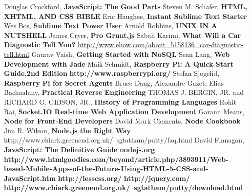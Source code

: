 \documentclass[11pt, oneside]{Thesis} %
\begin{document}
\begin{thebibliography}{999}
Douglas Crockford, \textbf{JavaScript: The Good Parts}
Steven M. Schafer, \textbf{HTML, XHTML, AND CSS BIBLE}
Eric Haughee, \textbf{Instant Sublime Text Starter}
Wes Bos, \textbf{Sublime Text Power User}
Arnold Robbins, \textbf{UNIX IN A NUTSHELL}
James Cryer, \textbf{Pro Grunt.js}
Sabah Karimi, \textbf{What Will a Car Diagnostic Tell You?} \url{http://www.ehow.com/about_5158136_car-diagnostic-tell.html}
Gaurav Vaish, \textbf{Getting Started with NoSQL}
Sean Lang, \textbf{Web Development with Jade}
Maik Schmidt, \textbf{Raspberry Pi: A Quick-Start Guide,2nd Edition}
\textbf{http://www.raspberrypi.org/}
Stefan Sjogelid, \textbf{Raspberry Pi for Secret Agents}
Bruce Dang, Alexandre Gazet, Elias Bachaalany, \textbf{Practical Reverse Engineering}
THOMAS J. BERGIN, JR. and RICHARD G. GIBSON, JR., \textbf{History of Programming Languages}
Rohit Rai, \textbf{Socket.IO Real-time Web Application Development}
Garann Means, \textbf{Node for Front-End Developers}
David Mark Clements, \textbf{Node Cookbook}
Jim R. Wilson, \textbf{Node.js the Right Way}
http://www.chiark.greenend.org.uk/~sgtatham/putty/faq.html
David Flanagan, \textbf{JavaScript: The Definitive Guide}
\textbf{nodejs.org}
\textbf{http://www.htmlgoodies.com/beyond/article.php/3893911/Web-based-Mobile-Apps-of-the-Future-Using-HTML-5-CSS-and-JavaScript.htm}
\textbf{http://lesscss.org/}
\textbf{http://jquery.com/}
\textbf{http://www.chiark.greenend.org.uk/~sgtatham/putty/download.html}
\end{thebibliography}
\end{document}

